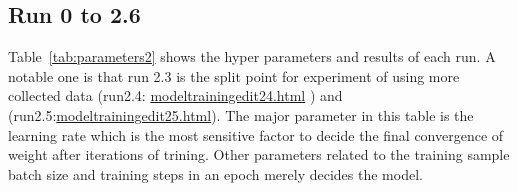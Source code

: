 \documentclass[paper=a4, fontsize=11pt]{scrartcl} %
\numberwithin{equation}{section} %
\numberwithin{figure}{section} %
\numberwithin{table}{section} %
\begin{document}
\begin{enumerate}
\begin{itemize}
{\subsection{Run 0 to 2.6}\label{rubric21}
Table~\ref{tab:parameters2} shows the hyper parameters and results of each run. A notable one is that run 2.3 is the split point for experiment of using more collected data (run2.4: \href{run:./JupyterNotebooks/modeltrainingedit24.html}{modeltrainingedit24.html} ) and (run2.5:\href{run:./JupyterNotebooks/modeltrainingedit25.html}{modeltrainingedit25.html}).
The major parameter in this table is the learning rate which is the most sensitive factor to decide the final convergence of weight after iterations of trining. Other parameters related to the training sample batch size and training steps in an epoch merely decides the model.

}
\end{itemize}
\end{enumerate}
\end{document}
